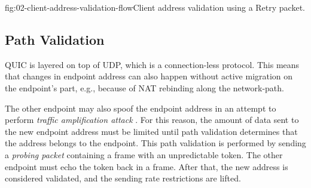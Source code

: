 \begin{myFigure}{fig:02-client-address-validation-flow}{Client address validation using a Retry
packet.}

\resizebox{\linewidth}{!}{}

\end{myFigure}

\subsection{Path Validation}\label{sec:02-path-validation}

QUIC is layered on top of UDP, which is a connection-less protocol. This means that changes in
endpoint address can also happen without active migration on the endpoint's part, e.g., because of
NAT rebinding along the \gls{network-path}.

The other endpoint may also spoof the endpoint address in an attempt to perform \textit{traffic
amplification attack} . For this reason, the amount of data sent to the new
endpoint address must be limited until path validation  determines that the address
belongs to the endpoint. This path validation is performed by sending a \textit{probing packet}
containing a \PATHCHALLENGE{} frame with an unpredictable token. The other endpoint must echo the
token back in a \PATHRESPONSE{} frame. After that, the new address is considered validated, and the
sending rate restrictions are lifted.
